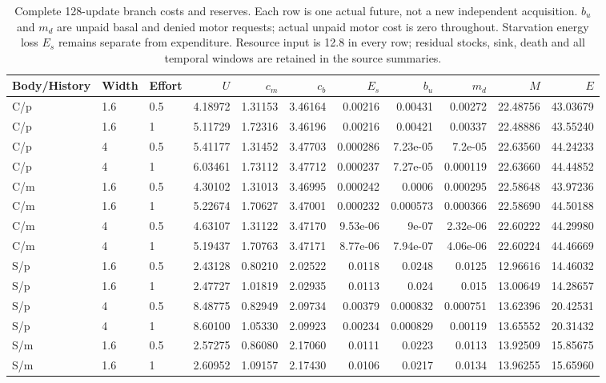 \begin{table}[htbp]\centering\scriptsize
\caption{Complete 128-update branch costs and reserves. Each row is one actual future, not a new independent acquisition. $b_u$ and $m_d$ are unpaid basal and denied motor requests; actual unpaid motor cost is zero throughout. Starvation energy loss $E_s$ remains separate from expenditure. Resource input is 12.8 in every row; residual stocks, sink, death and all temporal windows are retained in the source summaries.}\label{tab:effort-costs}
\setlength{\tabcolsep}{3pt}
\begin{tabular}{lllrrrrrrrr}\toprule
Body/History & Width & Effort & $U$ & $c_m$ & $c_b$ & $E_s$ & $b_u$ & $m_d$ & $M$ & $E$\\\midrule
C/p & 1.6 & 0.5 & 4.18972 & 1.31153 & 3.46164 & 0.00216 & 0.00431 & 0.00272 & 22.48756 & 43.03679 \\
C/p & 1.6 & 1 & 5.11729 & 1.72316 & 3.46196 & 0.00216 & 0.00421 & 0.00337 & 22.48886 & 43.55240 \\
C/p & 4 & 0.5 & 5.41177 & 1.31452 & 3.47703 & 0.000286 & 7.23e-05 & 7.2e-05 & 22.63560 & 44.24233 \\
C/p & 4 & 1 & 6.03461 & 1.73112 & 3.47712 & 0.000237 & 7.27e-05 & 0.000119 & 22.63660 & 44.44852 \\
C/m & 1.6 & 0.5 & 4.30102 & 1.31013 & 3.46995 & 0.000242 & 0.0006 & 0.000295 & 22.58648 & 43.97236 \\
C/m & 1.6 & 1 & 5.22674 & 1.70627 & 3.47001 & 0.000232 & 0.000573 & 0.000366 & 22.58690 & 44.50188 \\
C/m & 4 & 0.5 & 4.63107 & 1.31122 & 3.47170 & 9.53e-06 & 9e-07 & 2.32e-06 & 22.60222 & 44.29980 \\
C/m & 4 & 1 & 5.19437 & 1.70763 & 3.47171 & 8.77e-06 & 7.94e-07 & 4.06e-06 & 22.60224 & 44.46669 \\
S/p & 1.6 & 0.5 & 2.43128 & 0.80210 & 2.02522 & 0.0118 & 0.0248 & 0.0125 & 12.96616 & 14.46032 \\
S/p & 1.6 & 1 & 2.47727 & 1.01819 & 2.02935 & 0.0113 & 0.024 & 0.015 & 13.00649 & 14.28657 \\
S/p & 4 & 0.5 & 8.48775 & 0.82949 & 2.09734 & 0.00379 & 0.000832 & 0.000751 & 13.62396 & 20.42531 \\
S/p & 4 & 1 & 8.60100 & 1.05330 & 2.09923 & 0.00234 & 0.000829 & 0.00119 & 13.65552 & 20.31432 \\
S/m & 1.6 & 0.5 & 2.57275 & 0.86080 & 2.17060 & 0.0111 & 0.0223 & 0.0113 & 13.92509 & 15.85675 \\
S/m & 1.6 & 1 & 2.60952 & 1.09157 & 2.17430 & 0.0106 & 0.0217 & 0.0134 & 13.96255 & 15.65960 \\

\end{tabular}
\end{table}
